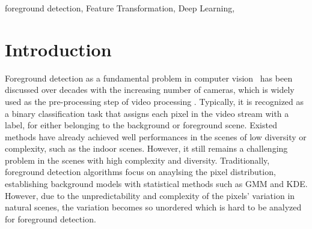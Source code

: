 \documentclass[journal]{IEEEtran}
\begin{document}
\begin{IEEEkeywords} 
    foreground detection, Feature Transformation, Deep Learning,
\end{IEEEkeywords}

\IEEEpeerreviewmaketitle

\section{Introduction}
Foreground detection as a fundamental problem in computer vision\ \cite{Bouwmans201431} has been discussed over decades with the increasing number of cameras,
which is widely used as the pre-processing step of video processing \cite{Barnich2011_2011_TIP}.
Typically, it is recognized as a binary classification task that assigns each pixel in the video stream with a label, 
for either belonging to the background or foreground scene.
Existed methods have already achieved well performances in the scenes of low diversity or complexity, such as the indoor scenes.
However, it still remains a challenging problem in the scenes with high complexity and diversity.
%
%
Traditionally, foreground detection algorithms focus on anaylsing the pixel distribution, establishing background models with statistical methods such as GMM and KDE.
However, due to the unpredictability and complexity of the pixels' variation in natural scenes,
the variation becomes so unordered which is hard to be analyzed for foreground detection.
\end{document}

